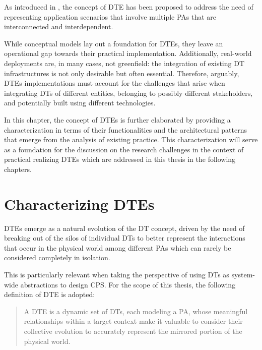 As introduced in , the concept of \acl{DTE} has been proposed to address the need of representing application scenarios that involve multiple \acp{PA} that are interconnected and interdependent.

While conceptual models lay out a foundation for \acp{DTE}, they leave an operational gap towards their practical implementation.
%
Additionally, real-world deployments are, in many cases, not greenfield: the integration of existing \ac{DT} infrastructures is not only desirable but often essential. 
%
Therefore, arguably, \acp{DTE} implementations must account for the challenges that arise when integrating \acp{DT} of different entities, belonging to possibly different stakeholders, and potentially built using different technologies.

In this chapter, the concept of \aclp{DTE} is further elaborated by providing a characterization in terms of their functionalities and the architectural patterns that emerge from the analysis of existing practice. 
%
This characterization will serve as a foundation for the discussion on the research challenges in the context of practical realizing \acp{DTE} which are addressed in this thesis in the following chapters.



\section{Characterizing \aclp{DTE}}
\label{sec:dte:dte:ecosystems}

\acp{DTE} emerge as a natural evolution of the \ac{DT} concept, driven by the need of breaking out of the silos of individual \acp{DT} to better represent the interactions that occur in the physical world among different \acp{PA} which can rarely be considered completely in isolation. 

This is particularly relevant when taking the perspective of using \acp{DT} as system-wide abstractions to design \ac{CPS}. 
%
For the scope of this thesis, the following definition of \acl{DTE} is adopted:

\begin{quotation}
    A \acl{DTE} is a dynamic set of \aclp{DT}, each modeling a \acl{PA}, whose meaningful relationships within a target context make it valuable to consider their collective evolution to accurately represent the mirrored portion of the physical world.
\end{quotation}

